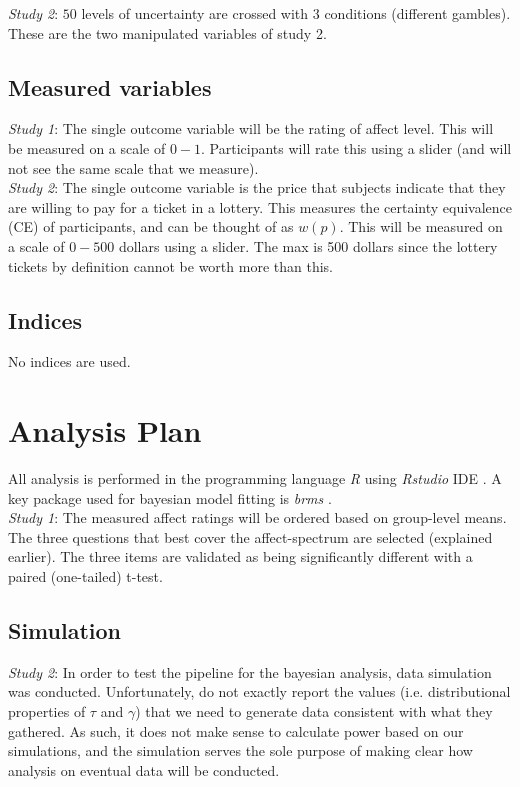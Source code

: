 \documentclass[12pt]{article}
\begin{document}
\emph{Study 2}: $50$ levels of uncertainty are
crossed with  $3$ conditions (different gambles).
These are the two manipulated variables of
study 2.

\subsection{Measured variables}

\emph{Study 1}: The single outcome variable
will be the rating of affect level. This will
be measured on a scale of $0-1$. Participants
will rate this using a slider (and will not see
the same scale that we measure). \\

\emph{Study 2}: The single outcome variable
is the price that subjects indicate that they
are willing to pay for a ticket in a lottery.
This measures the certainty equivalence (CE) of
participants, and can be thought of as $w(p)$.
This will be measured on a scale of $0-500$ dollars
using a slider. The max is 500 dollars since the
lottery tickets by definition cannot be worth
more than this.

\subsection{Indices}

No indices are used.

\section{Analysis Plan}

All analysis is performed in the programming
language \emph{R} \autocite{rcore} using
\emph{Rstudio} IDE
\autocite{rstudio}. A key package used for
bayesian model fitting is \emph{brms}
\autocite{brms}. \\

\emph{Study 1}: The measured affect ratings will be
ordered based on group-level means. The
three questions that best cover the affect-spectrum
are selected (explained earlier). The three items
are validated as being significantly different
with a paired (one-tailed) t-test.

\subsection{Simulation}

\emph{Study 2}: In order to test the pipeline for the
bayesian analysis, data simulation was
conducted. Unfortunately, \textcite{gonzalez1999shape}
do not exactly report the values (i.e.
distributional properties of $\tau$ and
$\gamma$) that we need
to generate data consistent with what they
gathered. As such, it does not make sense
to calculate power based on our simulations,
and the simulation serves the sole purpose
of making clear how analysis on eventual data
will be conducted. \\
\end{document}
